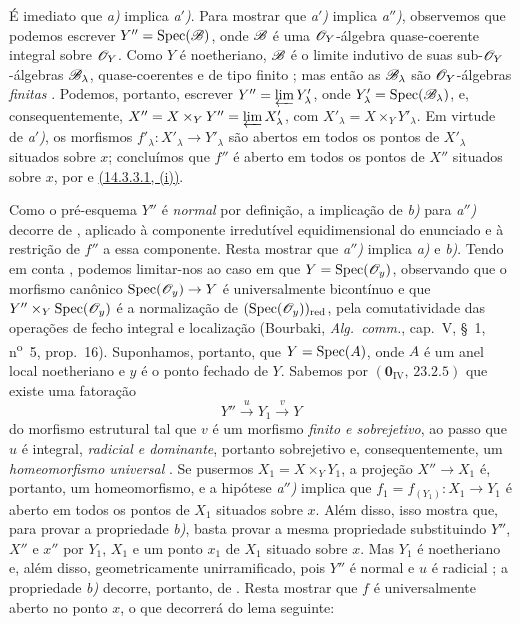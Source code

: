 É imediato que \emph{a)} implica \emph{a$'$)}.
Para mostrar que \emph{a$'$)} implica \emph{a$''$)}, observemos que podemos escrever $Y''=\operatorname{Spec}(\mathscr{B})$, onde $\mathscr{B}$ é uma $\mathscr{O}_Y$-álgebra quase-coerente integral sobre $\mathscr{O}_Y$.
Como $Y$ é noetheriano, $\mathscr{B}$ é o limite indutivo de suas sub-$\mathscr{O}_Y$-álgebras $\mathscr{B}_\lambda$, quase-coerentes e de tipo finito ; mas então as $\mathscr{B}_\lambda$ são $\mathscr{O}_Y$-álgebras \emph{finitas} .
Podemos, portanto, escrever $Y''=\varprojlim Y'_\lambda$, onde $Y'_\lambda=\operatorname{Spec}(\mathscr{B}_\lambda)$, e, consequentemente, $X''=X\times_Y Y''=\varprojlim X'_\lambda$, com $X'_\lambda=X\times_Y Y'_\lambda$.
Em virtude de \emph{a$'$)}, os morfismos $f'_\lambda:X'_\lambda\to Y'_\lambda$ são abertos em todos os pontos de $X'_\lambda$ situados sobre $x$; concluímos que $f''$ é aberto em todos os pontos de $X''$ situados sobre $x$, por  e {\hyperlink{ega4.c04.subsec.14-3-3-1}{(14.3.3.1, (i))}}.

Como o pré-esquema $Y''$ é \emph{normal} por definição, a implicação de \emph{b)} para \emph{a$''$)} decorre de , aplicado à componente irredutível equidimensional do enunciado e à restrição de $f''$ a essa componente.
Resta mostrar que \emph{a$''$)} implica \emph{a)} e \emph{b)}.
Tendo em conta , podemos limitar-nos ao caso em que $Y=\operatorname{Spec}(\mathscr{O}_y)$, observando que o morfismo canônico $\Spec(\sh{O}_y)\to Y$ é universalmente bicontínuo  e que $Y''\times_Y\operatorname{Spec}(\mathscr{O}_y)$ é a normalização de $(\operatorname{Spec}(\mathscr{O}_y))_{\mathrm{red}}$, pela comutatividade das operações de fecho integral e localização (Bourbaki, \emph{Alg.\ comm.}, cap.~V, \S~1, n\textsuperscript{o}~5, prop.~16).
Suponhamos, portanto, que $Y=\operatorname{Spec}(A)$, onde $A$ é um anel local noetheriano e $y$ é o ponto fechado de $Y$.
Sabemos por $(\mathbf{0}_{\mathrm{IV}},\,23.2.5)$ que existe uma fatoração
\[
  Y''\xrightarrow{u}Y_1\xrightarrow{v}Y
\]
do morfismo estrutural tal que $v$ é um morfismo \emph{finito e sobrejetivo}, ao passo que $u$ é integral, \emph{radicial e dominante}, portanto sobrejetivo  e, consequentemente, um \emph{homeomorfismo universal} .
Se pusermos $X_1=X\times_Y Y_1$, a projeção $X''\to X_1$ é, portanto, um homeomorfismo, e a hipótese \emph{a$''$)} implica que $f_1=f_{(Y_1)}:X_1\to Y_1$ é aberto em todos os pontos de $X_1$ situados sobre $x$.
Além disso, isso mostra que, para provar a propriedade \emph{b)}, basta provar a mesma propriedade substituindo $Y''$, $X''$ e $x''$ por $Y_1$, $X_1$ e um ponto $x_1$ de $X_1$ situado sobre $x$.
Mas $Y_1$ é noetheriano e, além disso, geometricamente unirramificado, pois $Y''$ é normal e $u$ é radicial ; a propriedade \emph{b)} decorre, portanto, de .
Resta mostrar que $f$ é universalmente aberto no ponto $x$, o que decorrerá do lema seguinte:

